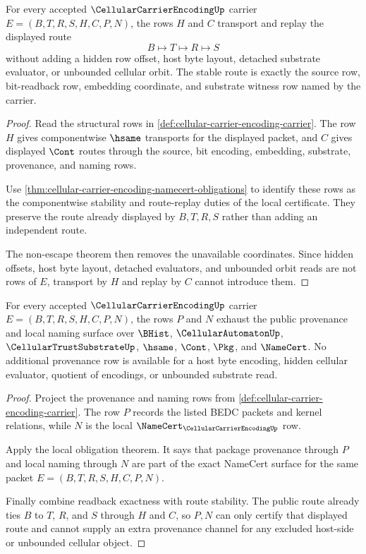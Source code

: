 \begin{theorem}
\label{thm:cellular-carrier-encoding-route-stability}
For every accepted $\CellularCarrierEncodingUp$ carrier $E=(B,T,R,S,H,C,P,N)$, the rows $H$ and $C$ transport and replay the displayed route
$$
B \longmapsto T \longmapsto R \longmapsto S
$$
without adding a hidden row offset, host byte layout, detached substrate evaluator, or unbounded cellular orbit. The stable route is exactly the source row, bit-readback row, embedding coordinate, and substrate witness row named by the carrier.
\end{theorem}
\begin{proof}
Read the structural rows in \autoref{def:cellular-carrier-encoding-carrier}. The row $H$ gives componentwise $\hsame$ transports for the displayed packet, and $C$ gives displayed $\Cont$ routes through the source, bit encoding, embedding, substrate, provenance, and naming rows.

Use \autoref{thm:cellular-carrier-encoding-namecert-obligations} to identify these rows as the componentwise stability and route-replay duties of the local certificate. They preserve the route already displayed by $B,T,R,S$ rather than adding an independent route.

The non-escape theorem then removes the unavailable coordinates. Since hidden offsets, host byte layout, detached evaluators, and unbounded orbit reads are not rows of $E$, transport by $H$ and replay by $C$ cannot introduce them.
\end{proof}

\begin{theorem}
\label{thm:cellular-carrier-encoding-provenance-exhaustion}
For every accepted $\CellularCarrierEncodingUp$ carrier $E=(B,T,R,S,H,C,P,N)$, the rows $P$ and $N$ exhaust the public provenance and local naming surface over $\BHist$, $\CellularAutomatonUp$, $\CellularTrustSubstrateUp$, $\hsame$, $\Cont$, $\Pkg$, and $\NameCert$. No additional provenance row is available for a host byte encoding, hidden cellular evaluator, quotient of encodings, or unbounded substrate read.
\end{theorem}
\begin{proof}
Project the provenance and naming rows from \autoref{def:cellular-carrier-encoding-carrier}. The row $P$ records the listed BEDC packets and kernel relations, while $N$ is the local $\NameCert_{\CellularCarrierEncodingUp}$ row.

Apply the local obligation theorem. It says that package provenance through $P$ and local naming through $N$ are part of the exact NameCert surface for the same packet $E=(B,T,R,S,H,C,P,N)$.

Finally combine readback exactness with route stability. The public route already ties $B$ to $T$, $R$, and $S$ through $H$ and $C$, so $P,N$ can only certify that displayed route and cannot supply an extra provenance channel for any excluded host-side or unbounded cellular object.
\end{proof}

